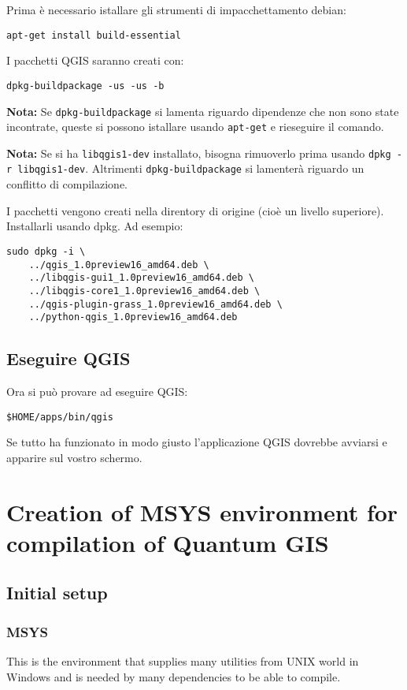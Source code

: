 Prima è necessario istallare gli strumenti di impacchettamento debian:

\begin{verbatim}
apt-get install build-essential
\end{verbatim}

I pacchetti QGIS saranno creati con:

\begin{verbatim}
dpkg-buildpackage -us -us -b
\end{verbatim}

\textbf{Nota:} Se \texttt{dpkg-buildpackage} si lamenta riguardo dipendenze che non sono state incontrate, queste si possono istallare usando \texttt{apt-get} e rieseguire il comando.

\textbf{Nota:} Se si ha \texttt{libqgis1-dev} installato, bisogna rimuoverlo prima usando \texttt{dpkg -r libqgis1-dev}.  Altrimenti \texttt{dpkg-buildpackage} si lamenterà riguardo un conflitto di compilazione.

I pacchetti vengono creati nella direntory di origine (cioè un livello superiore).
Installarli usando dpkg.  Ad esempio:

\begin{verbatim}
sudo dpkg -i \
	../qgis_1.0preview16_amd64.deb \
	../libqgis-gui1_1.0preview16_amd64.deb \
	../libqgis-core1_1.0preview16_amd64.deb \
	../qgis-plugin-grass_1.0preview16_amd64.deb \
	../python-qgis_1.0preview16_amd64.deb
\end{verbatim}

\subsection{Eseguire QGIS}
Ora si può provare ad eseguire QGIS:

\begin{verbatim}
$HOME/apps/bin/qgis 
\end{verbatim}

Se tutto ha funzionato in modo giusto l'applicazione QGIS dovrebbe avviarsi e apparire sul vostro schermo.


\section{Creation of MSYS environment for compilation of Quantum GIS}
\subsection{Initial setup}
\subsubsection{MSYS}
This is the environment that supplies many utilities from UNIX world in Windows and is needed
by many dependencies to be able to compile.

